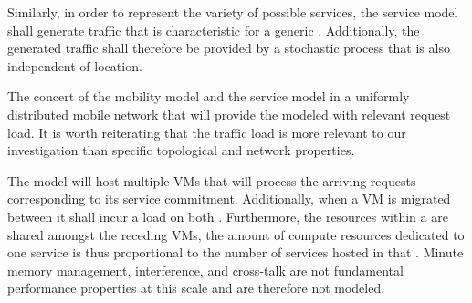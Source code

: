 Similarly, in order to represent the variety of possible services, the service model shall generate traffic that is characteristic for a generic \ue{}. Additionally, the generated traffic shall therefore be provided by a stochastic process that is also independent of location.

The concert of the mobility model and the service model in a uniformly distributed mobile network that will provide the modeled \dcs{} with relevant request load. It is worth reiterating that the traffic load is more relevant to our investigation than specific topological and network properties.

The \dc{} model will host multiple VMs that will process the arriving requests corresponding to its service commitment. Additionally, when a VM is migrated between \dcs{} it shall incur a load on both \dcs{}. Furthermore, the resources within a \dc{} are shared amongst the receding VMs, the amount of compute resources dedicated to one service is thus proportional to the number of services hosted in that \dc{}.  Minute memory management, interference, and cross-talk are not fundamental performance properties at this scale and are therefore not modeled.